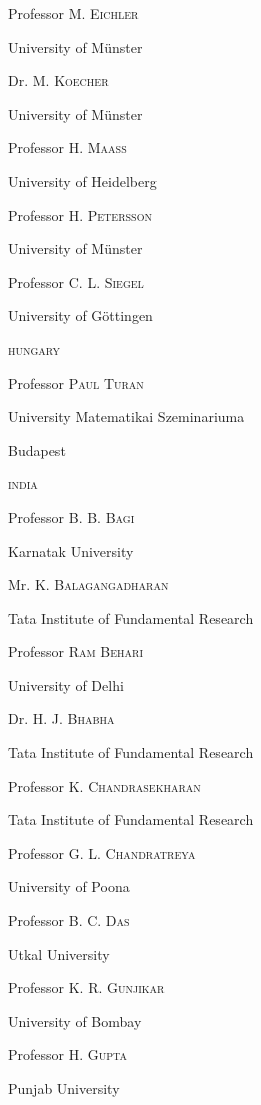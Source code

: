 \quad Professor \textsc{M. Eichler}\pageoriginale

\quad University of M\"unster
\smallskip

\quad Dr. \textsc{M. Koecher}

\quad University of M\"unster
\smallskip

\quad Professor \textsc{H. Maass}

\quad University of Heidelberg
\smallskip

\quad Professor \textsc{H. Petersson}

\quad University of M\"unster
\smallskip

\quad Professor \textsc{C. L. Siegel}

\quad University of G\"ottingen
\medskip

\noindent
\textsc{hungary}

\quad Professor \textsc{Paul Turan}

\quad University Matematikai Szeminariuma

\quad Budapest
\medskip

\noindent
\textsc{india}

\quad Professor \textsc{B. B. Bagi}

\quad Karnatak University
\smallskip

\quad Mr. \textsc{K. Balagangadharan}

\quad Tata Institute of Fundamental Research
\smallskip

\quad Professor \textsc{Ram Behari}

\quad University of Delhi
\smallskip

\quad Dr. \textsc{H. J. Bhabha}

\quad Tata Institute of Fundamental Research
\smallskip

\quad Professor \textsc{K. Chandrasekharan}

\quad Tata Institute of Fundamental Research
\smallskip

\quad Professor \textsc{G. L. Chandratreya}

\quad University of Poona
\smallskip

\quad Professor \textsc{B. C. Das}\pageoriginale

\quad Utkal University
\smallskip

\quad Professor \textsc{K. R. Gunjikar}

\quad University of Bombay
\smallskip

\quad Professor \textsc{H. Gupta}

\quad Punjab University

